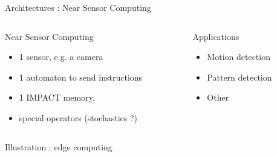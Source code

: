%
\begin{Frame}{Architectures :  Near Sensor Computing }
  \begin{columns}[t]
    \begin{column}{\BW} %
      \begin{block}{Near Sensor Computing}
        \begin{itemize}
        \item 1 sensor, e.g. a camera
        \item 1 automaton to send instructions
        \item 1 IMPACT memory,
        \item special operators (stochastics ?)
        \end{itemize}
      \end{block}
    \end{column}

    \begin{column}{\BW} %
      \begin{block}{Applications}
        \begin{itemize}
        \item Motion detection
        \item Pattern detection
        \item Other
        \end{itemize}
      \end{block}
    \end{column}
  \end{columns}
      \begin{block}{Illustration : edge computing}
      \end{block}
\end{Frame}


